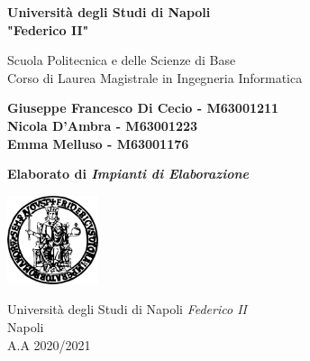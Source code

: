 \begin{titlepage}
	\begin{center}
		\vspace*{1cm}
		
		\Huge
		\textbf{Università degli Studi di Napoli \\ "Federico II"}
		
		\vspace{0.5cm}
		\LARGE
		Scuola Politecnica e delle Scienze di Base\\
		Corso di Laurea Magistrale in Ingegneria Informatica
		
		\vspace{1.5cm}
		
		\textbf{Giuseppe Francesco Di Cecio - M63001211}
		\\
		\textbf{Nicola D'Ambra - M63001223}
		\\
		\textbf{Emma Melluso - M63001176}
		
		\vspace{2cm}
		
		
		
		\vspace{0.5cm}
		\LARGE
		\textbf{Elaborato di \textit{Impianti di Elaborazione}}
		\vfill
		
		\includegraphics[width=0.2\textwidth]{img/logo.png}
		
		\Large
		Università degli Studi di Napoli \textit{Federico II}\\
		Napoli\\
		A.A 2020/2021
		
	\end{center}
\end{titlepage}
